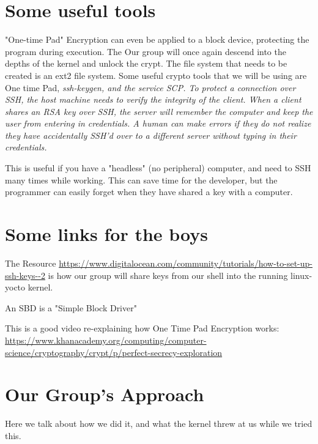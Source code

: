 \documentclass[onecolumn, draftclsnofoot,10pt, compsoc]{IEEEtran}
\begin{document}
	\section{ Some useful tools}	
	"One-time Pad" Encryption can even be applied to a block device, protecting the program during execution.
	The  Our group will once again descend into the depths of the kernel and unlock the crypt.
	The file system that needs to be created is an ext2 file system. Some useful crypto tools that we will be using are One time Pad, \it{ssh-keygen}, and the service \it{SCP}. To protect a connection over SSH, the host machine needs to verify the integrity of the client. 
	When a client shares an RSA key over SSH, the server will remember the computer and keep the user from entering in credentials.
	A human can make errors if they do not realize they have accidentally SSH'd over to a different server without typing in their credentials. 

	This is useful if you have a "headless" (no peripheral) computer, and need to SSH many times while working. This can save time for the developer, but the programmer can easily forget when they have shared a key with a computer.
	\section{ Some links for the boys }
	The Resource \url{https://www.digitalocean.com/community/tutorials/how-to-set-up-ssh-keys--2} is how our group will share keys from our shell into the running linux-yocto kernel.

	An SBD is a "Simple Block Driver" \cite{corbet_2003}	

    This is a good video re-explaining how One Time Pad Encryption works: \url{ https://www.khanacademy.org/computing/computer-science/cryptography/crypt/p/perfect-secrecy-exploration}


	\section{ Our Group's Approach }
	Here we talk about how we did it, and what the kernel threw at us while we tried this.
        
\end{document}
